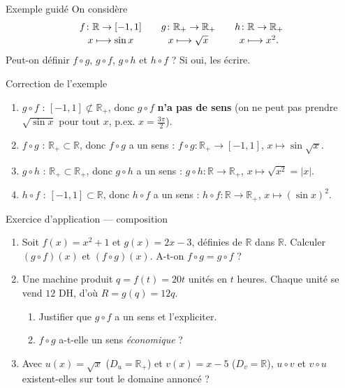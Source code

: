 \documentclass[aspectratio=169,11pt]{beamer}
\newcommand{\R}{\mathbb{R}}
\newcommand{\important}[1]{\textbf{\color{DarkRed}#1}}
\newcommand{\fonc}[3]{#1\colon #2\to #3}
\begin{document}
\begin{frame}{Exemple guidé}
	On considère
	\[
		\begin{array}{c@{\qquad}c@{\qquad}c}
			\fonc{f}{\R}{[-1,1]} &
			\fonc{g}{\R_+}{\R_+} &
			\fonc{h}{\R}{\R_+} \\[2pt]
			x\longmapsto \sin x &
			x\longmapsto \sqrt{x} &
			x\longmapsto x^2.
		\end{array}
	\]
	Peut-on définir $f\circ g$, $g\circ f$, $g\circ h$ et $h\circ f$ ? Si oui, les écrire.
\end{frame}

\begin{frame}{Correction de l'exemple}
	\begin{exemplebox}[Correction]
		\begin{enumerate}
			\item $g\circ f$ : $[-1,1]\not\subset \R_+$, donc $g\circ f$ \important{n'a pas de sens}
			(on ne peut pas prendre $\sqrt{\sin x}$ pour tout $x$, p.ex. $x=\frac{3\pi}{2}$).
			\item $f\circ g$ : $\R_+\subset\R$, donc $f\circ g$ a un sens :
			$\fonc{f\circ g}{\R_+}{[-1,1]}$, $x\longmapsto \sin\sqrt{x}$.
			\item $g\circ h$ : $\R_+\subset\R_+$, donc $g\circ h$ a un sens :
			$\fonc{g\circ h}{\R}{\R_+}$, $x\longmapsto \sqrt{x^2}=\lvert x\rvert$.
			\item $h\circ f$ : $[-1,1]\subset\R$, donc $h\circ f$ a un sens :
			$\fonc{h\circ f}{\R}{\R_+}$, $x\longmapsto (\sin x)^2$.
		\end{enumerate}
	\end{exemplebox}
\end{frame}

\begin{frame}{Exercice d'application --- composition}
	\begin{exercicebox}[Exercice 2.4]
		\begin{enumerate}
			\item Soit $f(x)=x^2+1$ et $g(x)=2x-3$, définies de $\R$ dans $\R$.
			Calculer $(g\circ f)(x)$ et $(f\circ g)(x)$. A-t-on $f\circ g=g\circ f$ ?
			\item Une machine produit $q=f(t)=20t$ unités en $t$ heures.
			Chaque unité se vend $12$ DH, d'où $R=g(q)=12q$.
			\begin{enumerate}
				\item Justifier que $g\circ f$ a un sens et l'expliciter.
				\item $f\circ g$ a-t-elle un sens \emph{économique} ?
			\end{enumerate}
			\item Avec $u(x)=\sqrt{x}$ ($D_u=\R_+$) et $v(x)=x-5$ ($D_v=\R$),
			$u\circ v$ et $v\circ u$ existent-elles sur tout le domaine annoncé ?
		\end{enumerate}
	\end{exercicebox}
\end{frame}
\end{document}

